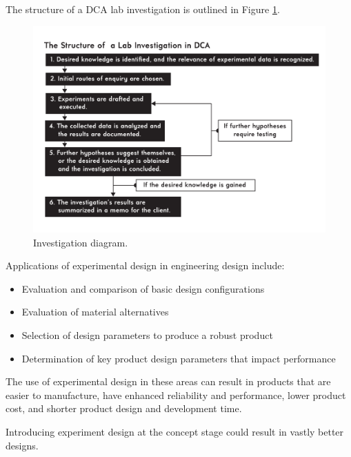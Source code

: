 \documentclass[11pt,a4paper,article]{memoir} %
\begin{document}
\par
The structure of a DCA lab investigation is outlined in Figure \ref{fig:investigation_diagram}.
\begin{figure}[h!]
\centering
\includegraphics[width=1.2\textwidth]{Lab_Investigation_Diagram.pdf}
\caption{Investigation diagram.}
\label{fig:investigation_diagram}
\end{figure}


Applications of experimental design in engineering design include:
\begin{itemize}
\item Evaluation and comparison of basic design configurations
\item Evaluation of material alternatives
\item Selection of design parameters to produce a robust product
\item Determination of key product design parameters that impact performance
\end{itemize}
The use of experimental design in these areas can result in products that are easier to manufacture, have enhanced reliability and performance, lower product cost, and shorter product design and development time.
\par
Introducing experiment design at the concept stage could result in vastly better designs.

\end{document}
